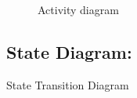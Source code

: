 \documentclass[oneside,a4paper,12pt]{report}
\begin{document}
\begin{center}
	\begin{figure}[!htbp]
		\centering
	  \caption{Activity diagram}
	  \label{fig:act-dig}
	\end{figure}
\end{center}  

\newpage


\subsection{State Diagram:}	
  State Transition Diagram\\
\end{document}
